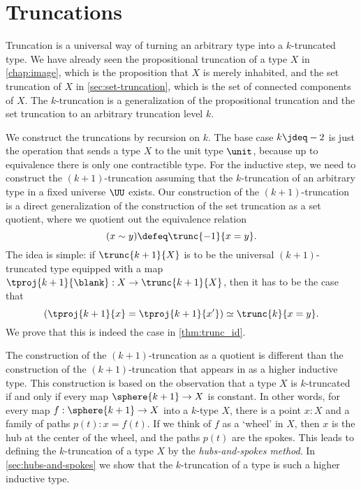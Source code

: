 \section{Truncations}

Truncation is a universal way of turning an arbitrary type into a $k$-truncated type. We have already seen the propositional truncation of a type $X$ in \cref{chap:image}, which is the proposition that $X$ is merely inhabited, and the set truncation of $X$ in \cref{sec:set-truncation}, which is the set of connected components of $X$. The $k$-truncation is a generalization of the propositional truncation and the set truncation to an arbitrary truncation level $k$.

We construct the truncations by recursion on $k$. The base case $k\jdeq -2$ is just the operation that sends a type $X$ to the unit type $\unit$, because up to equivalence there is only one contractible type. For the inductive step, we need to construct the $(k+1)$-truncation assuming that the $k$-truncation of an arbitrary type in a fixed universe $\UU$ exists. Our construction of the $(k+1)$-truncation is a direct generalization of the construction of the set truncation as a set quotient, where we quotient out the equivalence relation
\begin{equation*}
  (x\sim y)\defeq \trunc{-1}{x=y}.
\end{equation*}
The idea is simple: if $\trunc{k+1}{X}$ is to be the universal $(k+1)$-truncated type equipped with a map $\tproj{k+1}{\blank}:X\to \trunc{k+1}{X}$, then it has to be the case that
\begin{equation*}
  (\tproj{k+1}{x}=\tproj{k+1}{x'})\simeq \trunc{k}{x=y}.
\end{equation*}
We prove that this is indeed the case in \cref{thm:trunc_id}.

The construction of the $(k+1)$-truncation as a quotient is different than the construction of the $(k+1)$-truncation that appears in \cite{hottbook} as a higher inductive type. This construction is based on the observation that a type $X$ is $k$-truncated if and only if every map $\sphere{k+1}\to X$ is constant. In other words, for every map $f:\sphere{k+1}\to X$ into a $k$-type $X$, there is a point $x:X$ and a family of paths $p(t):x=f(t)$. If we think of $f$ as a `wheel' in $X$, then $x$ is the hub at the center of the wheel, and the paths $p(t)$ are the spokes. This leads to defining the $k$-truncation of a type $X$ by the \emph{hubs-and-spokes method}. In \cref{sec:hubs-and-spokes} we show that the $k$-truncation of a type is such a higher inductive type.

